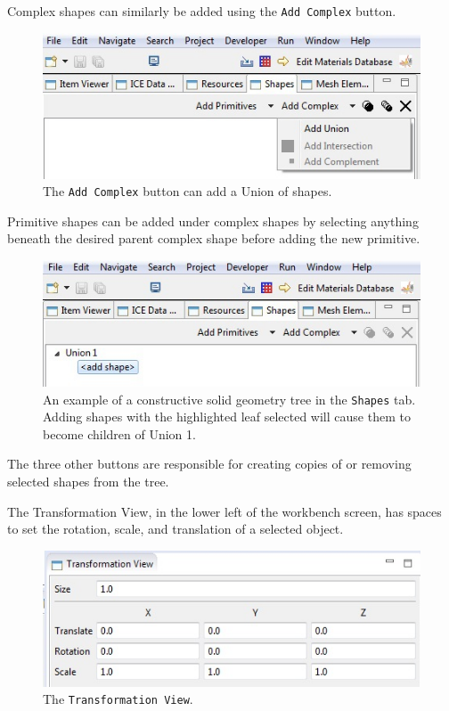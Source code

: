 Complex shapes can similarly be added using the \texttt{Add Complex} button.

\begin{figure}[!h]
\includegraphics[width=12cm]{images/AddComplexShape}
\centering
\caption{The \texttt{Add Complex} button can add a Union of shapes.}
\label{fig:addcomplexshape}
\end{figure}

Primitive shapes can be added under complex shapes by selecting anything beneath
the desired parent complex shape before adding the new primitive.

\begin{figure}[!h]
\includegraphics[width=12cm]{images/ComplexShapeTree}
\centering
\caption{An example of a constructive solid geometry tree in the
\texttt{Shapes} tab. Adding shapes with the highlighted leaf selected will
cause them to become children of Union 1.}
\label{fig:complexshapetree}
\end{figure}

The three other buttons are responsible for creating copies of or removing
selected shapes from the tree. 

The Transformation View, in the lower left of the workbench screen, has spaces
to set the rotation, scale, and translation of a selected object.

\begin{figure}[!h]
\includegraphics[width=12cm]{images/TransformationView}
\centering
\caption{The \texttt{Transformation View}.}
\label{fig:transformationview}
\end{figure}

